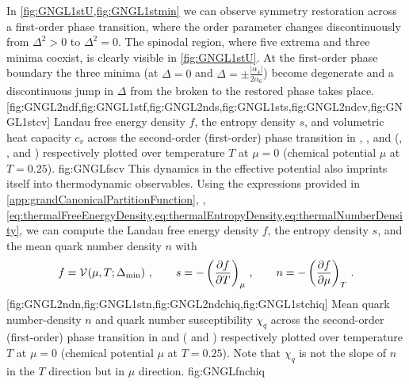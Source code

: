 In \cref{fig:GNGL1stU,fig:GNGL1stmin} we can observe symmetry restoration across a first-order phase transition, where the order parameter changes discontinuously from $\Delta^2>0$ to $\Delta^2=0$.
The spinodal region, where five extrema and three minima coexist, is clearly visible in \cref{fig:GNGL1stU}.
At the first-order phase boundary the three minima (at $\Delta=0$ and $\Delta=\pm\frac{|\alpha_4|}{2\alpha_6}$) become degenerate and a discontinuous jump in $\Delta$ from the broken to the restored phase takes place.\bigskip
{}%
	[fig:GNGL2ndf,fig:GNGL1stf,fig:GNGL2nds,fig:GNGL1sts,fig:GNGL2ndcv,fig:GNGL1stcv]%
	{%
		Landau free energy density $f$, the entropy density $s$, and volumetric heat capacity $c_v$ across the second-order (first-order) phase transition in , , and  (, , and ) respectively plotted over temperature $T$ at $\mu=0$ (chemical potential $\mu$ at $T=0.25$).
	}%
	{fig:GNGLfscv}%
This dynamics in the effective potential also imprints itself into thermodynamic observables.
Using the expressions provided in \cref{app:grandCanonicalPartitionFunction}, \ie{}, \cref{eq:thermalFreeEnergyDensity,eq:thermalEntropyDensity,eq:thermalNumberDensity}, we can compute
the Landau free energy density $f$, the entropy density $s$, and the mean quark number density $n$ with
\begin{align}
f=\VeffArgs{\muT;\Delta_\mathrm{min}}\, ,\qquad s = -\del{\frac{\partial f}{\partial T}}_\mu\, ,\qquad n = -\del{\frac{\partial f}{\partial \mu}}_T\,.
\end{align}
	[fig:GNGL2ndn,fig:GNGL1stn,fig:GNGL2ndchiq,fig:GNGL1stchiq]%
	{%
	 Mean quark number-density $n$ and quark number susceptibility $\chi_q$ across the second-order (first-order) phase transition in  and  ( and ) respectively plotted over temperature $T$ at $\mu=0$ (chemical potential $\mu$ at $T=0.25$). Note that $\chi_q$ is not the slope of $n$ in the $T$ direction but in $\mu$ direction.
	}%
	{fig:GNGLfnchiq}%
